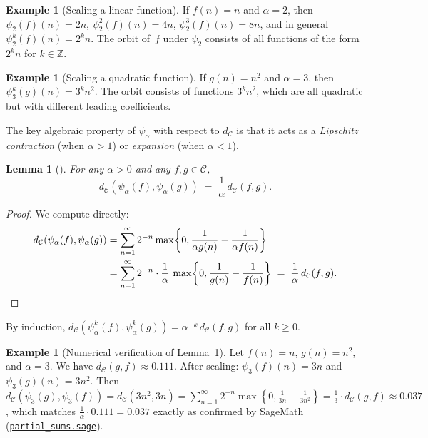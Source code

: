 \documentclass[11pt,a4paper]{article}
\newcommand{\repourl}{https://github.com/gabayae/expansive-homeomorphisms-complexity-qmetric}
\theoremstyle{plain}
\newtheorem{lemmainner}[theoreminner]{Lemma}
\theoremstyle{definition}
\newtheorem{exampleinner}[theoreminner]{Example}
\newenvironment{lemma}[1][]{\begin{lemmainner}[#1]}{\end{lemmainner}}
\newenvironment{example}[1][]{\begin{exampleinner}[#1]}{\end{exampleinner}}
\newcommand{\Z}{\mathbb{Z}}
\newcommand{\C}{\mathcal{C}}
\begin{document}
\begin{example}[Scaling a linear function]
If $f(n)=n$ and $\alpha=2$, then $\psi_2(f)(n)=2n$,
$\psi_2^2(f)(n)=4n$, $\psi_2^3(f)(n)=8n$, and in general
$\psi_2^k(f)(n)=2^k n$.  The orbit of~$f$ under $\psi_2$
consists of all functions of the form $2^k n$ for $k\in\Z$.
\end{example}

\begin{example}[Scaling a quadratic function]
If $g(n)=n^2$ and $\alpha=3$, then $\psi_3^k(g)(n)=3^k n^2$.
The orbit consists of functions $3^k n^2$, which are all
quadratic but with different leading coefficients.
\end{example}

The key algebraic property of $\psi_\alpha$ with respect to $d_\C$
is that it acts as a \emph{Lipschitz contraction} (when $\alpha>1$)
or \emph{expansion} (when $\alpha<1$).

\begin{lemma}\label{lem:scaling-lip}
For any $\alpha>0$ and any $f,g\in\C$,
\[
  d_\C(\psi_\alpha(f),\psi_\alpha(g))
  \;=\; \frac{1}{\alpha}\,d_\C(f,g).
\]
\end{lemma}

\begin{proof}
We compute directly:
\begin{align*}
  d_\C(\psi_\alpha(f),\psi_\alpha(g))
  &= \sum_{n=1}^{\infty}2^{-n}\max\!\left\{0,
     \frac{1}{\alpha g(n)}-\frac{1}{\alpha f(n)}\right\}\\
  &= \sum_{n=1}^{\infty}2^{-n}\cdot\frac{1}{\alpha}\,
     \max\!\left\{0,\frac{1}{g(n)}-\frac{1}{f(n)}\right\}
  \;=\;\frac{1}{\alpha}\,d_\C(f,g). \qedhere
\end{align*}
\end{proof}

By induction, $d_\C(\psi_\alpha^k(f),\psi_\alpha^k(g))
=\alpha^{-k}\,d_\C(f,g)$ for all $k\ge 0$.

\begin{example}[Numerical verification of Lemma~\ref{lem:scaling-lip}]
\label{ex:lip-numerical}
Let $f(n)=n$, $g(n)=n^2$, and $\alpha=3$.  We have
$d_\C(g,f)\approx 0.111$.  After scaling:
$\psi_3(f)(n)=3n$ and $\psi_3(g)(n)=3n^2$.  Then
$d_\C(\psi_3(g),\psi_3(f))=d_\C(3n^2,3n)
=\sum_{n=1}^\infty 2^{-n}\max\!\left\{0,\frac{1}{3n}-\frac{1}{3n^2}\right\}
=\frac{1}{3}\cdot d_\C(g,f)\approx 0.037$, which matches
$\frac{1}{\alpha}\cdot 0.111=0.037$ exactly
as confirmed by SageMath
(\href{\repourl/blob/main/code/sagemath/partial_sums.sage}{\texttt{partial\_sums.sage}}).
\end{example}
\end{document}
